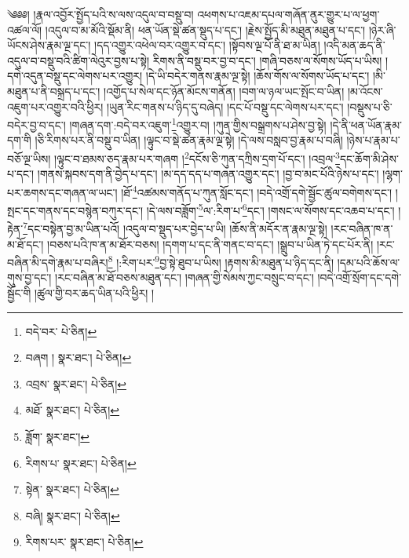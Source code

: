 \setcounter{footnote}{0} 
༄༅༅། །རྣལ་འབྱོར་སྤྱོད་པའི་ས་ལས་འདུལ་བ་བསྡུ་བ། འཕགས་པ་འཇམ་དཔལ་གཞོན་ནུར་གྱུར་པ་ལ་ཕྱག་འཚལ་ལོ། །འདུལ་བ་མ་མོའི་སྡོམ་ནི། ཕན་ཡོན་སྡེ་ཚན་སྡུད་པ་དང་། །རྗེས་སྤྱོད་མི་མཐུན་མཐུན་པ་དང་། །ཉེར་ཞི་ཡོངས་ཤེས་རྣམ་ལྔ་དང་། །དད་འགྱུར་འཕེལ་བར་འགྱུར་བ་དང་། །སྟོབས་ལྔ་པོ་ནི་ཐ་མ་ཡིན། །འདི་མན་ཆད་ནི་འདུལ་བ་བསྡུ་བའི་ཚིག་ལེའུར་བྱས་པ་སྟེ། རིགས་ནི་བསྡུ་བར་བྱ་བ་དང་། །གཞི་བཅས་ལ་སོགས་ཡོད་པ་ཡིས། །དགེ་འདུན་བསྡུ་དང་ལེགས་པར་འགྱུར། །དེ་ཡི་བདེར་གནས་རྣམ་ལྔ་སྟེ། །ཆོས་གོས་ལ་སོགས་ཡོད་པ་དང་། །མི་མཐུན་པ་ནི་བསྐྲད་པ་དང་། །འགྱོད་པ་སེལ་དང་ཉོན་མོངས་གནོན། །བག་ལ་ཉལ་ཡང་སྤོང་བ་ཡིན། །མ་འོངས་འཇུག་པར་འགྱུར་བའི་ཕྱིར། །ཡུན་རིང་གནས་པ་ཉིད་དུ་བཞེད། །དང་པོ་བསྡུ་དང་ལེགས་པར་དང་། །བསྡུས་པ་ཅི་བདེར་བྱ་བ་དང་། །གཞན་དག་:བདེ་བར་འཇུག་\footnote{བདེ་བར་  པེ་ཅིན། }འགྱུར་བ། །ཀུན་གྱིས་བསྒྲགས་པ་ཤེས་བྱ་སྟེ། །དེ་ནི་ཕན་ཡོན་རྣམ་དག་གི །ཅི་རིགས་པར་ནི་བསྡུ་བ་ཡིན། །ལྟུང་བ་སྡེ་ཚན་རྣམ་ལྔ་སྟེ། །དེ་ལས་བསླབ་བྱ་རྣམ་པ་བཞི། །ཉེས་པ་རྣམ་པ་བཅོ་ལྔ་ཡིས། །ལྟུང་བ་ཐམས་ཅད་རྣམ་པར་གཞག །\footnote{བཞག །  སྣར་ཐང་།  པེ་ཅིན། }དངོས་ཅི་ཀུན་དཀྲིས་དྲག་པོ་དང་། །འབྲལ་\footnote{འབྲས་  སྣར་ཐང་།  པེ་ཅིན། }དང་ཆོག་མི་ཤེས་པ་དང་། །གནས་སྐབས་དག་ནི་བྱེད་པ་དང་། །མ་དད་དད་པ་གཞན་འགྱུར་དང་། །བྱ་བ་མང་པོའི་ཉེས་པ་དང་། །ལྷག་པར་ཆགས་དང་གཞན་ལ་ཡང་། །ཐོ་\footnote{མཐོ་  སྣར་ཐང་།  པེ་ཅིན། }འཚམས་གནོད་པ་ཀུན་སློང་དང་། །བདེ་འགྲོ་དགེ་སྦྱོང་ཚུལ་བགེགས་དང་། །སྤང་དང་གནས་དང་བསྙེན་བཀུར་དང་། །དེ་ལས་བཟློག་\footnote{ཟློག་  སྣར་ཐང་། }ལ་:རིག་པ་\footnote{རིགས་པ་  སྣར་ཐང་།  པེ་ཅིན། }དང་། །གསང་ལ་སོགས་དང་འཆབ་པ་དང་། །རྟེན་\footnote{སྟེན་  སྣར་ཐང་།  པེ་ཅིན། }དང་བསྟེན་བྱ་མ་ཡིན་པའོ། །འདུལ་བ་སྡུད་པར་བྱེད་པ་ཡི། །ཆོས་ནི་མདོར་ན་རྣམ་ལྔ་སྟེ། །རང་བཞིན་ཁ་ན་མ་ཐོ་དང་། །བཅས་པའི་ཁ་ན་མ་ཐོར་བཅས། །དགག་པ་དང་ནི་གནང་བ་དང་། །སྒྲུབ་པ་ཡིན་ཏེ་དང་པོར་ནི། །རང་བཞིན་མི་དགེ་རྣམ་པ་བཞིར།\footnote{བཞི།  སྣར་ཐང་།  པེ་ཅིན། } །:རིག་པར་\footnote{རིགས་པར་  སྣར་ཐང་།  པེ་ཅིན། }བྱ་སྟེ་ཐུབ་པ་ཡིས། །རྟགས་མི་མཐུན་པ་ཉིད་དང་ནི། །དམ་པའི་ཆོས་ལ་གུས་བྱ་དང་། །རང་བཞིན་མ་ཐོ་བཅས་མཐུན་དང་། །གཞན་གྱི་སེམས་ཀྱང་བསྲུང་བ་དང་། །བདེ་འགྲོ་སྲོག་དང་དགེ་སྦྱོང་གི །ཚུལ་གྱི་བར་ཆད་ཡིན་པའི་ཕྱིར། །
